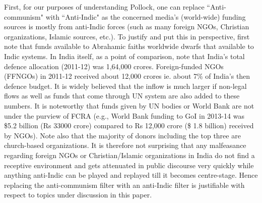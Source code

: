First, for our purposes of understanding Pollock, one can replace ``Anti-communism" with ``Anti-Indic" as the concerned media’s (world-wide) funding sources is mostly from anti-Indic forces (such as many foreign NGOs, Christian organizations, Islamic sources, etc.). To justify and put this in perspective, first note that funds available to Abrahamic faiths worldwide dwarfs that available to Indic systems. In India itself, as a point of comparison, note that India’s total defence allocation (2011-12) was 1,64,000 crores. Foreign-funded NGOs (FFNGOs) in 2011-12 received about 12,000 crores ie. about 7\% of India's then defence budget. It is widely believed that the inflow is much larger if non-legal flows as well as funds that come through UN system are also added to these numbers. It is noteworthy that funds given by UN bodies or World Bank are not under the purview of FCRA (e.g., World Bank funding to GoI in 2013-14 was \$5.2 billion (Rs 33000 crore) compared to Rs 12,000 crore (\$ 1.8 billion) received by NGOs). Note also that the majority of donors including the top three are church-based organizations. It is therefore not surprising that any malfeasance regarding foreign NGOs or Christian/Islamic organizations in India do not find a receptive environment and gets attenuated in public discourse very quickly while anything anti-Indic can be played and replayed till it becomes centre-stage. Hence replacing the anti-communism filter with an anti-Indic filter is justifiable with respect to topics under discussion in this paper.

